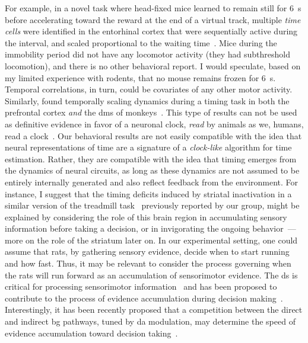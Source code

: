 For example, in a novel task where head-fixed mice learned to remain still for 6~s before accelerating toward the reward at the end of a virtual track, multiple \textit{time cells} were identified in the entorhinal cortex that were sequentially active during the interval, and scaled proportional to the waiting time~\cite{Heys2018NN}.
Mice during the immobility period did not have any locomotor activity (they had subthreshold locomotion), and there is no other behavioral report.
I would speculate, based on my limited experience with rodents, that no mouse remains frozen for 6~s.
Temporal correlations, in turn, could be covariates of any other motor activity.
Similarly,  found temporally scaling dynamics during a timing task in both the prefrontal cortex \textit{and} the \gls{dms} of monkeys~\cite{JazayeriNN2018}.
This type of results can not be used as definitive evidence in favor of a neuronal clock, \emph{read}\! by animals as we, humans, read a clock~\cite{Krakauer2017Neuron, Buzsaki2017SciRev, Buzsaki2018TICS}.
Our behavioral results are not easily compatible with the idea that neural representations of time are a signature of a \emph{clock-like}\! algorithm for time estimation.
Rather, they are compatible with the idea that timing emerges from the dynamics of neural circuits, as long as these dynamics are not assumed to be entirely internally generated and also reflect feedback from the environment.
For instance, I suggest that the timing deficits induced by striatal inactivation in a similar version of the treadmill task~\cite{Rueda2015NN} previously reported by our group, might be explained by considering the role of this brain region in accumulating sensory information before taking a decision, or in invigorating the ongoing behavior~\cite{Yartsev2018eLife,Dunovan2016FrontNeurosci}---more on the role of the striatum later on.
In our experimental setting, one could assume that rats, by gathering sensory evidence, decide when to start running and how fast.
Thus, it may be relevant to consider the process governing when the rats will run forward as an accumulation of sensorimotor evidence.
The \gls{ds} is critical for processing sensorimotor information~\cite{Robbe2018} and has been proposed to contribute to the process of evidence accumulation during decision making~\cite{Yartsev2018eLife}.
Interestingly, it has been recently proposed that a competition between the direct and indirect \gls{bg} pathways, tuned by \gls{da} modulation, may determine the speed of evidence accumulation toward decision taking~\cite{Dunovan2016FrontNeurosci}.

